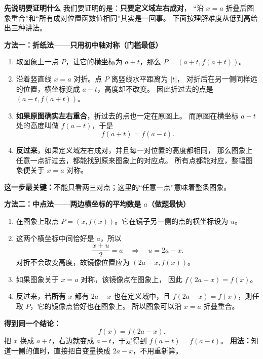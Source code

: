 \clearpage
\begin{proofbox}
  \textbf{\textcolor{CProof}{先说明要证明什么}}
  我们要证明的是：\textbf{只要定义域左右成对}，
  “沿 $x=a$ 折叠后图象重合”和“所有成对位置函数值相同”其实是一回事。
  下面按理解难度从低到高给出三种讲法。

  \medskip
  \textbf{\textcolor{CProof}{方法一：折纸法——只用初中轴对称（门槛最低）}}


  \begin{enumerate}[leftmargin=*,itemsep=0.5em]
    \item 取图象上一点 $P$，让它的横坐标为 $a+t$，那么
      $P=(a+t,f(a+t))$。
    \item 沿着竖直线 $x=a$ 对折。点 $P$ 离竖线水平距离为 $|t|$，
      对折后在另一侧同样远的位置，横坐标变成 $a-t$，高度却不改变。
      因此折过去的点是 $(a-t,f(a+t))$。
    \item \textbf{如果原图确实左右重合}，折过去的点也一定在原图上。
      而原图在横坐标 $a-t$ 处的高度叫做 $f(a-t)$，于是
      \[
        f(a+t)=f(a-t).
      \]
    \item \textbf{反过来}，如果定义域左右成对，并且每一对位置的高度都相同，
      那么图象上任意一点折过去，都能找到原来图象上的对应点。
      所有点都能对应，整幅图象便关于 $x=a$ 对称。
  \end{enumerate}
  \textbf{这一步最关键：}不能只看两三对点；这里的“任意一点”意味着整条图象。

  \medskip
  
\end{proofbox}
\clearpage
\begin{proofbox}
\textbf{\textcolor{CProof}{方法二：中点法——两边横坐标的平均数是 $a$（做题最快）}}


  \begin{enumerate}[leftmargin=*,itemsep=0.5em]
    \item 在图象上取点 $P=(x,f(x))$。它在镜子另一侧的点的横坐标设为 $u$。
    \item 这两个横坐标中间恰好是 $a$，所以
      \[
        \frac{x+u}{2}=a \quad\Longrightarrow\quad u=2a-x.
      \]
      对折不会改变高度，故镜像位置应为 $(2a-x,f(x))$。
    \item 如果图象关于 $x=a$ 对称，该镜像点在图象上，
      因此 $f(2a-x)=f(x)$。
    \item 反过来，若\textbf{所有} $x$ 都有 $2a-x$ 也在定义域中，且
      $f(2a-x)=f(x)$，则任取 $P$，它的镜像点恰好也在图象上。
      所以图象可以沿 $x=a$ 折叠重合。
  \end{enumerate}
  \textbf{得到同一个结论：}
  \[
    \boxed{f(x)=f(2a-x)}.
  \]
  把 $x$ 换成 $a+t$，右边就变成 $a-t$，于是得到 $f(a+t)=f(a-t)$。
  \textbf{用法：}知道一侧的值时，直接把自变量换成 $2a-x$，不用重新算。

  \medskip
  
\end{proofbox}
